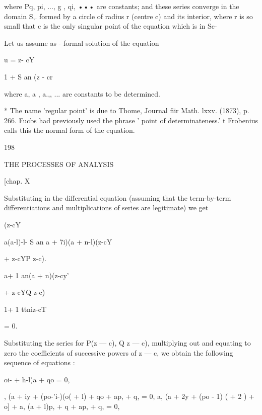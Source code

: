 where Pq, pi, ..., g , qi, ••• are constants; and these series converge in the 
domain S,. formed by a circle of radius r (centre c) and its interior, where r is 
so small that c is the only singular point of the equation which is in Sc- 

Let us assume as - formal solution of the equation 



u =  z- cY 



1 + S an (z - cr 



where a, a , a.,, ... are constants to be determined. 

* The name 'regular point' is due to Thome, Journal fiir Math. lxxv. (1873), p. 266. 
Fucbs had previously used the phrase ' point of determinateness.' 
t Frobenius calls this the normal form of the equation. 



198 



THE PROCESSES OF ANALYSIS 



[chap. X 



Substituting in the differential equation (assuming that the term-by-term 
differentiations and multiplications of series are legitimate) we get 



(z-cY 



a(a-l)-l- S an a + 7i)(a + n-l)(z-cY 



+  z-cYP z-c). 



a+ 1 an(a + n)(z-cy' 



+  z-cYQ z-c) 



1+ 1 ttniz-cT 



= 0. 



Substituting the series for P(z — c), Q z — c), multiplying out and equating 
to zero the coefficients of successive powers of z — c, we obtain the following 
sequence of equations : 

oi- +   h-l)a + qo = 0, 

 ,  (a + iy + (po-'i-)(o( + l) + qo + ap, + q, = 0, 
a,  (a + 2y + (po - 1) (  + 2 ) +  o] + a, (a + l)p, + q   + ap, + q, = 0, 

